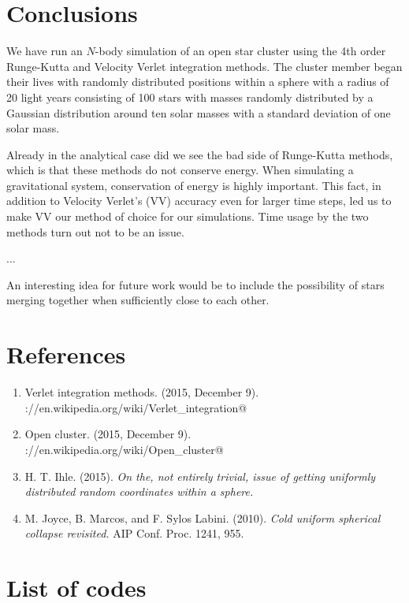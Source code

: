 \documentclass{article}
\begin{document}
\begin{multicols}{2}
\section{Conclusions}\label{sec:conclusion}

We have run an $N$-body simulation of an open star cluster using the 4th order Runge-Kutta and Velocity Verlet integration methods. The cluster member began their lives with randomly distributed positions within a sphere with a radius of 20 light years consisting of 100 stars with masses randomly distributed by a Gaussian distribution around ten solar masses with a standard deviation of one solar mass.

Already in the analytical case did we see the bad side of Runge-Kutta methods, which is that these methods do not conserve energy. When simulating a gravitational system, conservation of energy is highly important. This fact, in addition to Velocity Verlet's (VV) accuracy even for larger time steps, led us to make VV our method of choice for our simulations. Time usage by the two methods turn out not to be an issue.

...

An interesting idea for future work would be to include the possibility of stars merging together when sufficiently close to each other.

\section{References}

\begin{enumerate}
	\item Verlet integration methods. (2015, December 9). \\ \verb@https://en.wikipedia.org/wiki/Verlet_integration@
	\item Open cluster. (2015, December 9). \\ \verb@https://en.wikipedia.org/wiki/Open_cluster@
	\item H. T. Ihle. (2015). \textit{On the, not entirely trivial, issue of getting uniformly distributed random coordinates within a sphere.} 
	\item M. Joyce, B. Marcos, and F. Sylos Labini. (2010). \textit{Cold uniform spherical collapse revisited.} AIP Conf. Proc. 1241, 955.
\end{enumerate}



\section{List of codes}


\end{multicols}
\end{document}
